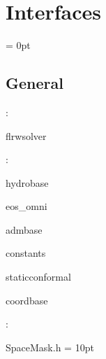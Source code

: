 
\section{Interfaces} 


\parskip = 0pt

\vspace{3mm} \subsection*{General}

: 

flrwsolver
\vspace{2mm}

: 

hydrobase

eos\_omni

admbase

constants

staticconformal

coordbase
\vspace{2mm}

\vspace{5mm}

: 

SpaceMask.h
\vspace{2mm}\parskip = 10pt 
